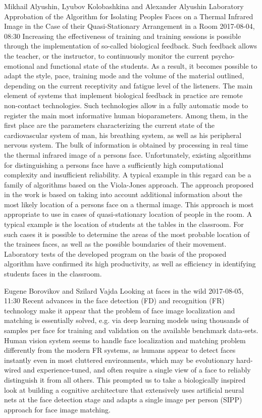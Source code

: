 \documentclass[10pt,fleqn,openany]{book} %
\begin{document}
\begin{enumerate}
		
		\paperabstract
		{Mikhail Alyushin, Lyubov Kolobashkina and Alexander Alyushin}
		{Laboratory Approbation of the Algorithm for Isolating Peoples Faces on a Thermal Infrared Image in the Case of their Quasi-Stationary Arrangement in a Room}
		{2017-08-04, 08:30}
		{Increasing the effectiveness of training and training sessions is possible through the implementation of so-called biological feedback. Such feedback allows the teacher, or the instructor, to continuously monitor the current psycho-emotional and functional state of the students. As a result, it becomes possible to adapt the style, pace, training mode and the volume of the material outlined, depending on the current receptivity and fatigue level of the listeners. The main element of systems that implement biological feedback in practice are remote non-contact technologies. Such technologies allow in a fully automatic mode to register the main most informative human bioparameters. Among them, in the first place are the parameters characterizing the current state of the cardiovascular system of man, his breathing system, as well as his peripheral nervous system. The bulk of information is obtained by processing in real time the thermal infrared image of a persons face. Unfortunately, existing algorithms for distinguishing a persons face have a sufficiently high computational complexity and insufficient reliability. A typical example in this regard can be a family of algorithms based on the Viola-Jones approach. The approach proposed in the work is based on taking into account additional information about the most likely location of a persons face on a thermal image. This approach is most appropriate to use in cases of quasi-stationary location of people in the room. A typical example is the location of students at the tables in the classroom. For such cases it is possible to determine the areas of the most probable location of the trainees faces, as well as the possible boundaries of their movement. Laboratory tests of the developed program on the basis of the proposed algorithm have confirmed its high productivity, as well as efficiency in identifying students faces in the classroom.}
		
		
		\paperabstract
		{Eugene Borovikov and Szilard Vajda}
		{Looking at faces in the wild}
		{2017-08-05, 11:30}
		{Recent advances in the face detection (FD) and recognition (FR) technology make it appear that the problem of face image localization and matching is essentially solved, e.g. via deep learning models using thousands of samples per face for training and validation on the available benchmark data-sets. Human vision system seems to handle face localization and matching problem differently from the modern FR systems, as humans appear to detect faces instantly even in most cluttered environments, which may be evolutionary hard-wired and experience-tuned, and often require a single view of a face to reliably distinguish it from all others. This prompted us to take a biologically inspired look at building a cognitive architecture that extensively uses artificial neural nets at the face detection stage and adapts a single image per person (SIPP) approach for face image matching.}
		

\end{enumerate}
\end{document}
